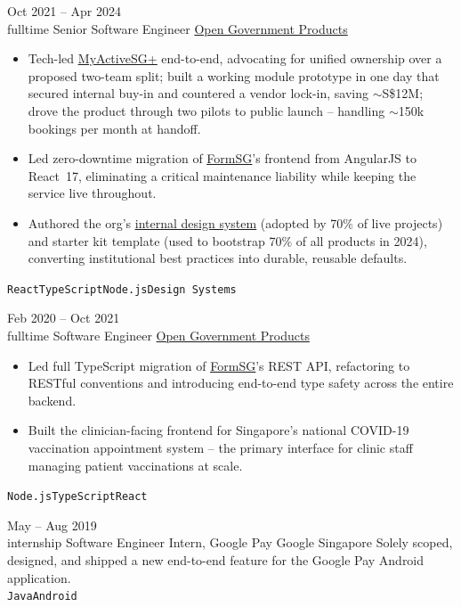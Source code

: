 \documentclass[9pt]{developercv} %
\begin{document}
\begin{entrylist}
	\entry
		{Oct 2021 -- Apr 2024\\\footnotesize{fulltime}}
		{Senior Software Engineer}
		{\href{https://open.gov.sg}{Open Government Products}}
		{
			\begin{itemize}[noitemsep, leftmargin=1.25em]
				\item Tech-led \underline{\href{https://active.gov.sg}{MyActiveSG+}} end-to-end, advocating for unified ownership over a proposed two-team split; built a working module prototype in one day that secured internal buy-in and countered a vendor lock-in, saving $\sim$S\$12M; drove the product through two pilots to public launch -- handling $\sim$150k bookings per month at handoff.
				\item Led zero-downtime migration of \underline{\href{https://form.gov.sg}{FormSG}}'s frontend from AngularJS to React~17, eliminating a critical maintenance liability while keeping the service live throughout.
				\item Authored the org's \underline{\href{https://github.com/opengovsg/camp-design-system}{internal design system}} (adopted by 70\% of live projects) and starter kit template (used to bootstrap 70\% of all products in 2024), converting institutional best practices into durable, reusable defaults.
			\end{itemize}
		\texttt{React}\slashsep\texttt{TypeScript}\slashsep\texttt{Node.js}\slashsep\texttt{Design Systems}}
	\entry
		{Feb 2020 -- Oct 2021\\\footnotesize{fulltime}}
		{Software Engineer}
		{\href{https://open.gov.sg}{Open Government Products}}
		{
			\begin{itemize}[noitemsep, leftmargin=1.25em]
				\item Led full TypeScript migration of \underline{\href{https://form.gov.sg}{FormSG}}'s REST API, refactoring to RESTful conventions and introducing end-to-end type safety across the entire backend.
				\item Built the clinician-facing frontend for Singapore's national COVID-19 vaccination appointment system -- the primary interface for clinic staff managing patient vaccinations at scale.
			\end{itemize}
		\texttt{Node.js}\slashsep\texttt{TypeScript}\slashsep\texttt{React}}
	\entry
		{May -- Aug 2019\\\footnotesize{internship}}
		{Software Engineer Intern, Google Pay}
		{Google Singapore}
		{Solely scoped, designed, and shipped a new end-to-end feature for the Google Pay Android application.
		\\ \texttt{Java}\slashsep\texttt{Android}}
\end{entrylist}
\end{document}
